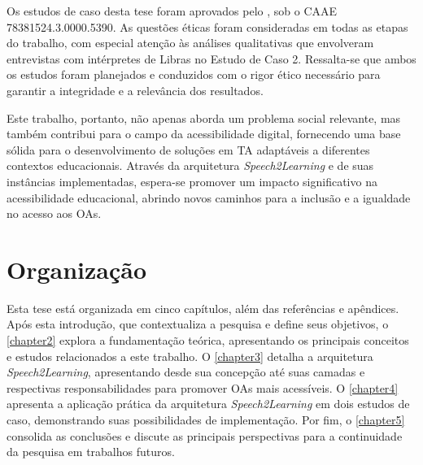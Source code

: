 Os estudos de caso desta tese foram aprovados pelo , sob o CAAE 78381524.3.0000.5390. As questões éticas foram consideradas em todas as etapas do trabalho, com especial atenção às análises qualitativas que envolveram entrevistas com intérpretes de Libras no Estudo de Caso 2. Ressalta-se que ambos os estudos foram planejados e conduzidos com o rigor ético necessário para garantir a integridade e a relevância dos resultados.

Este trabalho, portanto, não apenas aborda um problema social relevante, mas também contribui para o campo da acessibilidade digital, fornecendo uma base sólida para o desenvolvimento de soluções em TA adaptáveis a diferentes contextos educacionais. Através da arquitetura \textit{Speech2Learning} e de suas instâncias implementadas, espera-se promover um impacto significativo na acessibilidade educacional, abrindo novos caminhos para a inclusão e a igualdade no acesso aos OAs.

\section{Organização}

Esta tese está organizada em cinco capítulos, além das referências e apêndices. Após esta introdução, que contextualiza a pesquisa e define seus objetivos, o \autoref{chapter2} explora a fundamentação teórica, apresentando os principais conceitos e estudos relacionados a este trabalho. O \autoref{chapter3} detalha a arquitetura \textit{Speech2Learning}, apresentando desde sua concepção até suas camadas e respectivas responsabilidades para promover OAs mais acessíveis. O \autoref{chapter4} apresenta a aplicação prática da arquitetura \textit{Speech2Learning} em dois estudos de caso, demonstrando suas possibilidades de implementação. Por fim, o \autoref{chapter5} consolida as conclusões e discute as principais perspectivas para a continuidade da pesquisa em trabalhos futuros.